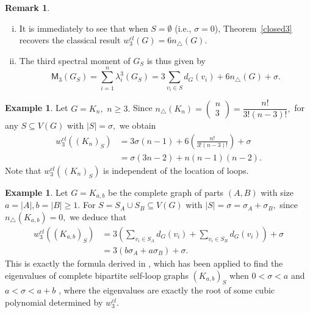 \documentclass[12pt,a4paper,reqno]{amsart}
\numberwithin{equation}{section}
\theoremstyle{plain}
\newtheorem{corollary}[theorem]{Corollary}
\theoremstyle{definition}
\newtheorem{remark}[theorem]{Remark}
\newtheorem{example}[theorem]{Example}
\newcommand{\<}{\langle}
\renewcommand{\>}{\rangle}
\begin{document}
\begin{remark}
\begin{enumerate}[(i)]
\item It is immediately to see that when $S=\emptyset$ (i.e., $\sigma=0$), Theorem~\ref{closed3} recovers the classical result $w^{cl}_3(G)=6n_\triangle(G).$
\item %
The third spectral moment of $G_S$ is thus given by
\[
\mathsf{M}_3(G_S)=\sum^n_{i=1} \lambda^3_i(G_S) = 3\sum_{v_i \in S} d_G(v_i) + 6 n_\triangle(G) + \sigma.
\]
\end{enumerate}
\end{remark}


\begin{example}
Let $G=K_n,$ $n \geq 3.$ Since
$
n_\triangle(K_n)= \begin{pmatrix}n \\ 3 \end{pmatrix} =  \dfrac{n!}{3!(n-3)!},
$
for any $S \subseteq V(G)$ with $|S|=\sigma,$  we obtain
\begin{align*}
w^{cl}_3((K_n)_S) 
&= 3 \sigma(n-1) + 6 \left(\frac{n!}{3!(n-3)!} \right) + \sigma\\
&=  \sigma(3n-2) + n(n-1)(n-2).
\end{align*}
Note that $w_3^{cl}((K_n)_S)$ is independent of the location of loops.
\end{example}

\begin{example}
Let $G=K_{a,b}$ be the complete graph of parts $(A,B)$ with size $a=|A|,b=|B| \geq 1.$ For $S = S_A \cup S_B \subseteq V(G)$ with $|S|=\sigma=\sigma_A + \sigma_B,$  since $n_{\triangle}(K_{a,b})=0,$ we deduce that 
\begin{align}
w^{cl}_3((K_{a,b})_S) 
&= 3 \left(\sum_{v_i \in S_A} d_G(v_i) + \sum_{v_i \in S_B} d_G(v_i) \right) + \sigma \nonumber\\
&= 3(b\sigma_A + a\sigma_B)+ \sigma. \label{eq:kmnS}
\end{align}
This is exactly the formula %
derived in \cite[Lemma 2.3]{akbari2023selfloop}, which has been applied to find the eigenvalues of complete bipartite self-loop graphs $(K_{a,b})_S$ when $0<\sigma<a$ and $a<\sigma<a+b$ \cite[Theorem 2.4]{akbari2023selfloop}, where the eigenvalues are exactly the root of some cubic polynomial determined by $w_3^{cl}.$ 
\end{example}
\end{document}
